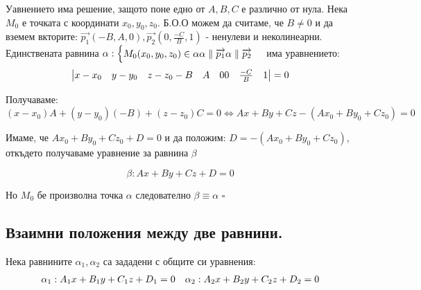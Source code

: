 \documentclass{article}
\renewcommand{\\}{\newline}
\newcommand{\proven}{\hfill $\square$}
\begin{document}
Уавнението има решение, защото поне едно от \(A, B, C\) е различно от нула. Нека \(M_0\) е точката с координати \(x_0, y_0, z_0\). Б.О.О можем да считаме, че \(B \not=0\) и да вземем вкторите: \(\overrightarrow{p_1}(-B, A, 0), \overrightarrow{p_2}(0, \frac{-C}{B}, 1)\) - ненулеви и неколинеарни. Единствената равнина \(\alpha: \begin{cases} M_0(x_0, y_0, z_0) \in \alpha \\ \alpha \parallel \overrightarrow{p_1} \\ \alpha \parallel \overrightarrow{p_2} \end{cases}\) има уравнението: \[
  \begin{vmatrix}
     x - x_0 & y - y_0 & z - z_0 \\ 
    -B & A & 0 \\ 
    0 & \frac{-C}{B} & 1
  \end{vmatrix} = 0
\]  

Получаваме: \((x-x_0)A + (y-y_0)(-B) + (z-z_0)C = 0 \iff Ax + By + Cz -(Ax_0 + By_0 + Cz_0) = 0\)

Имаме, че \(Ax_0 + By_0 + Cz_0 + D = 0\) и да положим: \(D = -(Ax_0 + By_0 + Cz_0)\), откъдето получаваме уравнение за равнина \(\beta\)

\[
  \beta: Ax + By + Cz + D = 0
\] 

Но \(M_0\) бе произволна точка \(\alpha\) следователно \(\beta \equiv \alpha\)  \proven   
  
\subsection{Взаимни положения между две равнини.}

Нека равнините \(\alpha_1, \alpha_2\) са зададени с общите си уравнения: \begin{align*}
&\alpha_1: A_1x + B_1y + C_1z + D_1 = 0 \\ 
&\alpha_2: A_2x + B_2y + C_2z + D_2 = 0 
\end{align*} 
\end{document}

